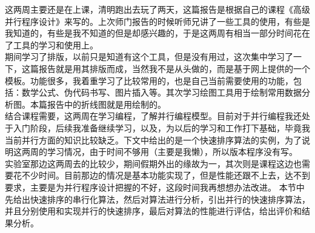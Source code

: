 \documentclass[fontsize=11pt, %
                             paper=a4, %
                             oneside, %
                             captions=tableheading,
                             index=totoc,
                             hyperref]{labbook}
\begin{document}
\begin{addmargin}[0cm]{0cm} %

\pagestyle{scrheadings} %

\indent 这两周主要还是在上课，清明跑出去玩了两天，这篇报告是根据自己的课程《高级并行程序设计》来写的。上次师门报告的时候听师兄讲了一些工具的使用，有些是我知道的，有些是我不知道的但是却感兴趣的，于是这两周有相当一部分时间花在了工具的学习和使用上。\\
\indent 期间学习了\en{\LaTeX{}}排版，以前只是知道有这个工具，但是没有用过，这次集中学习了一下，这篇报告就是用其排版而成，当然我不是从头做的，而是基于网上提供的一个模板。\en{\LaTeX{}}功能很多，我着重学习了比较常用的，也是自己当前需要使用的功能，包括：数学公式、伪代码书写、图片插入等。其次学习绘图工具用于绘制常用数据分析图。本篇报告中的折线图就是用绘制的。\\
\indent 结合课程需要，这两周在学习编程，了解并行编程模型。目前对于并行编程我还处于入门阶段，后续我准备继续学习，以及，为以后的学习和工作打下基础，毕竟我当前并行方面的知识比较缺乏。下文中给出的是一个快速排序算法的实例，为了说明这两周的学习情况，由于时间不够用（主要是我懒），所以版本程序没有写。\\
\indent 实验室那边这两周去的比较少，期间假期外出的缘故为一，其次则是课程这边也需要花不少时间。目前那边的情况是基本功能实现了，但是性能还跟不上去，达不到要求，主要是为并行程序设计把握的不好，这段时间我再想想办法改进。
\indent 本节中先给出快速排序的串行化算法，然后对算法进行分析，引出并行的快速排序算法，并且分别使用和实现并行的快速排序，最后对算法的性能进行评估，给出评价和结果分析。



\end{addmargin}
\end{document}

